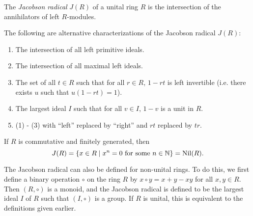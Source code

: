 \documentclass[12pt]{article}
\begin{document}
The {\em Jacobson radical} $J(R)$ of a unital ring $R$ is the intersection
of the annihilators of  left $R$-modules.

The following are alternative characterizations of the Jacobson radical $J(R)$:
\begin{enumerate}
\item The intersection of all left primitive ideals.
\item The intersection of all maximal left ideals.
\item The set of all $t \in R$ such that for all $r \in R$, $1-rt$ is
      left invertible (i.e. there exists $u$ such that $u(1-rt)=1$).
\item The largest ideal $I$ such that for all $v \in I$, $1-v$ is a
      unit in $R$.
\item (1) - (3) with ``left'' replaced by ``right'' and $rt$ replaced by $tr$.
\end{enumerate}

If $R$ is commutative and finitely generated, then 
\[
  J(R)=\{x \in R \mid x^n=0 \hbox{ for some } n \in \mathbb{N} \}
   = \operatorname{Nil}(R).
\]

The Jacobson radical can also be defined for non-unital rings.
To do this, we first define a binary operation $\circ$ on the ring $R$
by $x\circ y=x+y-xy$ for all $x,y\in R$.
Then $(R,\circ)$ is a monoid,
and the Jacobson radical is defined to be the largest ideal $I$ of $R$
such that $(I,\circ)$ is a group.
If $R$ is unital, this is equivalent to the definitions given earlier.
\end{document}
